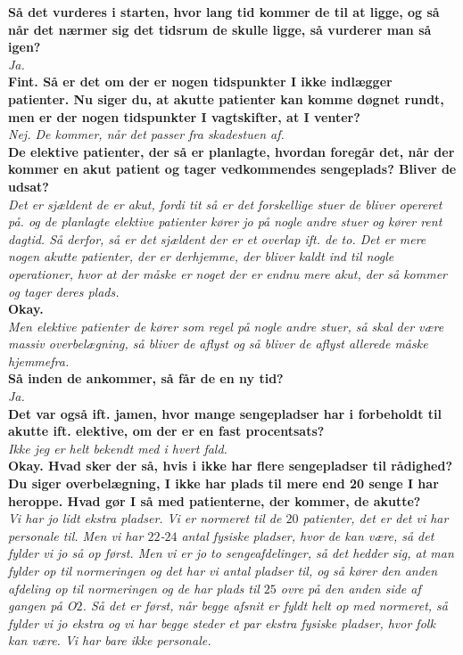 \noindent
\textbf{Så det vurderes i starten, hvor lang tid kommer de til at ligge, og så når det nærmer sig det tidsrum de skulle ligge, så vurderer man så igen?} \\
\noindent
\textit{Ja.} \\
\noindent
\textbf{Fint. Så er det om der er nogen tidspunkter I ikke indlægger patienter. Nu siger du, at akutte patienter kan komme døgnet rundt, men er der nogen tidspunkter I vagtskifter, at I venter?} \\
\noindent
\textit{Nej. De kommer, når det passer fra skadestuen af.} \\
\noindent
\textbf{De elektive patienter, der så er planlagte, hvordan foregår det, når der kommer en akut patient og tager vedkommendes sengeplads? Bliver de udsat?} \\
\noindent
\textit{Det er sjældent de er akut, fordi tit så er det forskellige stuer de bliver opereret på. og de planlagte elektive patienter kører jo på nogle andre stuer og kører rent dagtid. Så derfor, så er det sjældent der er et overlap ift. de to. Det er mere nogen akutte patienter, der er derhjemme, der bliver kaldt ind til nogle operationer, hvor at der måske er noget der er endnu mere akut, der så kommer og tager deres plads.} \\
\noindent
\textbf{Okay.} \\
\noindent
\textit{Men elektive patienter de kører som regel på nogle andre stuer, så skal der være massiv overbelægning, så bliver de aflyst og så bliver de aflyst allerede måske hjemmefra.} \\
\noindent
\textbf{Så inden de ankommer, så får de en ny tid?} \\
\noindent
\textit{Ja.} \\
\noindent
\textbf{Det var også ift. jamen, hvor mange sengepladser har i forbeholdt til akutte ift. elektive, om der er en fast procentsats?} \\
\noindent
\textit{Ikke jeg er helt bekendt med i hvert fald.} \\
\noindent
\textbf{Okay. Hvad sker der så, hvis i ikke har flere sengepladser til rådighed? Du siger overbelægning, I ikke har plads til mere end 20 senge I har heroppe. Hvad gør I så med patienterne, der kommer, de akutte?} \\
\noindent
\textit{Vi har jo lidt ekstra pladser. Vi er normeret til de $20$ patienter, det er det vi har personale til. Men vi har $22$-$24$ antal fysiske pladser, hvor de kan være, så det fylder vi jo så op først. Men vi er jo to sengeafdelinger, så det hedder sig, at man fylder op til normeringen og det har vi antal pladser til, og så kører den anden afdeling op til normeringen og de har plads til $25$ ovre på den anden side af gangen på O$2$. Så det er først, når begge afsnit er fyldt helt op med normeret, så fylder vi jo ekstra og vi har begge steder et par ekstra fysiske pladser, hvor folk kan være. Vi har bare ikke personale.} \\
